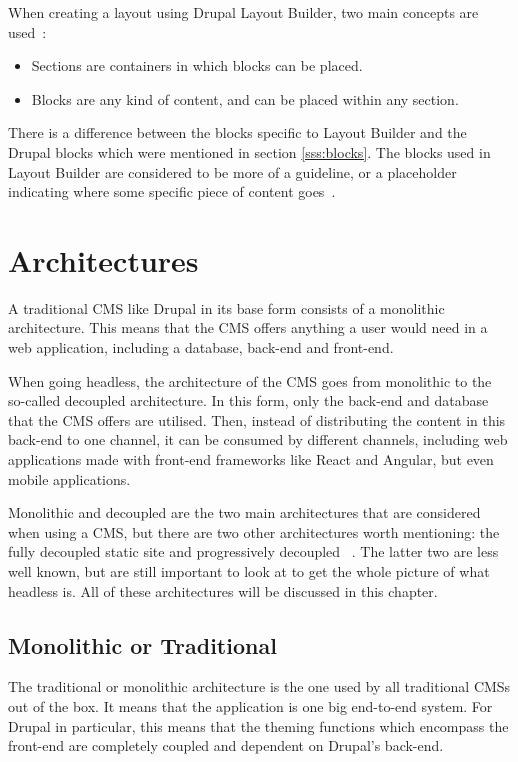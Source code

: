 When creating a layout using Drupal Layout Builder, two main concepts are used~\autocite{Drupalize2022}: 
\begin{itemize}
	\item  Sections are containers in which blocks can be placed.
	\item  Blocks are any kind of content, and can be placed within any section.
\end{itemize}
There is a difference between the blocks specific to Layout Builder and the Drupal blocks which were mentioned in section \ref{sss:blocks}. The blocks used in Layout Builder are considered to be more of a guideline, or a placeholder indicating where some specific piece of content goes~\autocite{Drupalize2022}.



\section{Architectures}
A traditional CMS like Drupal in its base form consists of a monolithic architecture. This means that the CMS offers anything a user would need in a web application, including a database, back-end and front-end.

When going headless, the architecture of the CMS goes from monolithic to the so-called decoupled architecture. In this form, only the back-end and database that the CMS offers are utilised. Then, instead of distributing the content in this back-end to one channel, it can be consumed by different channels, including web applications made with front-end frameworks like React and Angular, but even mobile applications.

Monolithic and decoupled are the two main architectures that are considered when using a CMS, but there are two other architectures worth mentioning: the fully decoupled static site and progressively decoupled ~\autocite{Dropsolid2021}. The latter two are less well known, but are still important to look at to get the whole picture of what headless is. All of these architectures will be discussed in this chapter.


\subsection{Monolithic or Traditional}
The traditional or monolithic architecture is the one used by all traditional CMSs out of the box. It means that the application is one big end-to-end system. For Drupal in particular, this means that the theming functions which encompass the front-end are completely coupled and dependent on Drupal's back-end.

